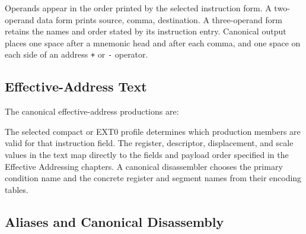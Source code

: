 Operands appear in the order printed by the selected instruction form. A two-operand data form prints source,
comma, destination. A three-operand form retains the names and order stated by its instruction entry. Canonical
output places one space after a mnemonic head and after each comma, and one space on each side of an address
\texttt{+} or \texttt{-} operator.

\subsection{Effective-Address Text}

The canonical effective-address productions are:

\begin{manualcode}
\end{manualcode}

The selected compact or EXT0 profile determines which production members are valid for that instruction field.
The register, descriptor, displacement, and scale values in the text map directly to the fields and payload order
specified in the Effective Addressing chapters. A canonical disassembler chooses the primary condition name and
the concrete register and segment names from their encoding tables.

\subsection{Aliases and Canonical Disassembly}

